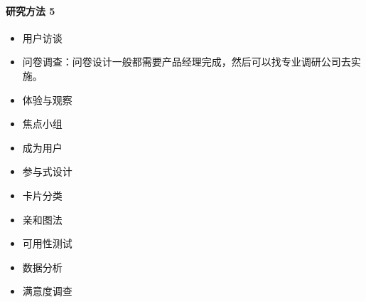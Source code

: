 \documentclass[letterpaper,11pt,english]{sphinxmanual}
\begin{document}
\paragraph{研究方法 5\sphinxfootnotemark[162]}
\label{\detokenize{chapter_skill/users_analysis:id22}}%
\begin{footnotetext}[162]\sphinxAtStartFootnote
{}
%
\end{footnotetext}\ignorespaces \begin{itemize}
\item {} 
用户访谈

\item {} 
问卷调查：问卷设计一般都需要产品经理完成，然后可以找专业调研公司去实施。

\item {} 
体验与观察

\item {} 
焦点小组

\item {} 
成为用户

\item {} 
参与式设计

\item {} 
卡片分类

\item {} 
亲和图法

\item {} 
可用性测试

\item {} 
数据分析

\item {} 
满意度调查

\end{itemize}
\end{document}
